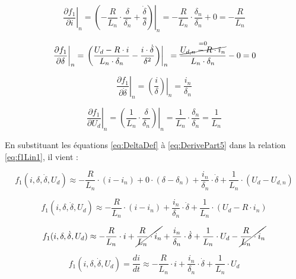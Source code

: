 \begin{equation}
    \left. \frac{\partial f_1}{\partial i} \right|_{n} = \left. \left(-\frac{R}{L_n}\cdot\frac{\delta}{\delta_n}+\frac{\dot{\delta}}{\delta}\right) \right|_{n} = -\frac{R}{L_n}\cdot\frac{\delta_n}{\delta_n}+0 = -\frac{R}{L_n}
    \label{eq:DerivePart2}
\end{equation}

\begin{equation}
    \left. \frac{\partial f_1}{\partial \delta} \right|_{n} = \left. \left( \frac{U_d - R\cdot i}{L_n \cdot \delta_n} - \frac{i \cdot \dot{\delta}}{\delta^2} \right) \right|_{n} = \frac{\overset{=0}{\cancel{U_{d,n} - R\cdot i_n}}}{L_n \cdot \delta_n} - 0 = 0
    \label{eq:DerivePart3}
\end{equation}

\begin{equation}
    \left. \frac{\partial f_1}{\partial \dot{\delta}} \right|_{n} = \left. \left( \frac{i}{\delta} \right) \right|_{n} = \frac{i_n}{\delta_n}
    \label{eq:DerivePart4}
\end{equation}

\begin{equation}
    \left. \frac{\partial f_1}{\partial U_d} \right|_{n} =
    \left. \left( \frac{1}{L_n}\cdot\frac{\delta}{\delta_n} \right) \right|_{n} = \frac{1}{L_n}\cdot\frac{\delta_n}{\delta_n} = \frac{1}{L_n}
    \label{eq:DerivePart5}
\end{equation}

En substituant les équations \ref{eq:DeltaDef} à \ref{eq:DerivePart5} dans la relation \ref{eq:f1Lin1}, il vient :

$$f_1(i, \delta, \dot{\delta}, U_d) \approx
    -\frac{R}{L_n} \cdot (i-i_n)
    + 0 \cdot (\delta-\delta_n)
    + \frac{i_n}{\delta_n}\cdot\dot{\delta}
    + \frac{1}{L_n}\cdot (U_d-U_{d,n}) $$

$$f_1(i, \delta, \dot{\delta}, U_d) \approx
    -\frac{R}{L_n} \cdot (i-i_n)
    + \frac{i_n}{\delta_n}\cdot\dot{\delta}
    + \frac{1}{L_n}\cdot (U_d-R\cdot i_n)$$

$$f_1(i, \delta, \dot{\delta}, U_d) \approx
    -\frac{R}{L_n} \cdot i
    + \cancel{\frac{R}{L_n} \cdot i_n}
    + \frac{i_n}{\delta_n}\cdot\dot{\delta}
    + \frac{1}{L_n}\cdot U_d
    - \cancel{\frac{R}{L_n}\cdot i_n} $$

\begin{equation}
    f_1(i, \delta, \dot{\delta}, U_d) = \frac{di}{dt} \approx
    -\frac{R}{L_n} \cdot i
    + \frac{i_n}{\delta_n}\cdot\dot{\delta}
    + \frac{1}{L_n}\cdot U_d
    \label{eq:f1Lin2}
\end{equation}

